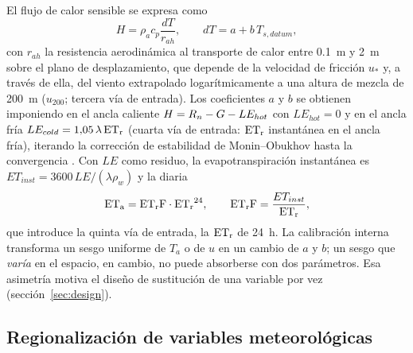 El flujo de calor sensible se expresa como
\begin{equation}
  H = \rho_a c_p \frac{dT}{r_{ah}}, \qquad dT = a + b\,T_{s,datum},
  \label{eq:h}
\end{equation}
con $r_{ah}$ la resistencia aerodinámica al transporte de calor entre
\SI{0,1}{\metre} y \SI{2}{\metre} sobre el plano de desplazamiento, que
depende de la velocidad de fricción $u_*$ y, a través de ella, del viento
extrapolado logarítmicamente a una altura de mezcla de \SI{200}{\metre}
($u_{200}$; tercera vía de entrada). Los coeficientes $a$ y $b$ se obtienen
imponiendo en el ancla caliente $H = R_n - G - LE_{hot}$ con $LE_{hot}=0$ y
en el ancla fría $LE_{cold} = 1{,}05\,\lambda\,\mathrm{ET_r}$ (cuarta vía de entrada:
$\mathrm{ET_r}$ instantánea en el ancla fría), iterando la corrección de estabilidad
de Monin--Obukhov hasta la convergencia \parencite{allen2007metric1,waters2002sebal}.
Con $LE$ como residuo, la evapotranspiración instantánea es $ET_{inst} =
3600\,LE/(\lambda\rho_w)$ y la diaria
\begin{equation}
  \mathrm{ET_a} = \mathrm{ET_rF} \cdot \mathrm{ET_r}^{24}, \qquad \mathrm{ET_rF} = \frac{ET_{inst}}{\mathrm{ET_r}},
  \label{eq:eta}
\end{equation}
que introduce la quinta vía de entrada, la $\mathrm{ET_r}$ de 24~h. La calibración
interna transforma un sesgo uniforme de $T_a$ o de $u$ en un cambio de $a$ y
$b$; un sesgo que \emph{varía} en el espacio, en cambio, no puede absorberse
con dos parámetros. Esa asimetría motiva el diseño de sustitución de una
variable por vez (sección~\ref{sec:design}).

\subsection{Regionalización de variables meteorológicas}

